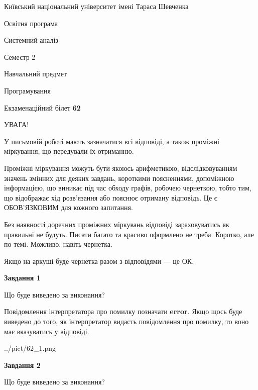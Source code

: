 \documentclass[12pt, ukrainian]{article}
\begin{document}
{{\begin {small}\par
{ \center  Київський національний університет імені Тараса Шевченка \par}
{\parbox {5 cm}{Освітня програма \hfill}{\parbox {7 cm}{Системний аналіз \hfill}}\parbox {6 cm}{\hfill Семестр 2}}\par
{\parbox {5 cm} {Навчальний предмет \hfill}\parbox {7 cm}{Програмування \hfill}\parbox {6cm}{\hfill}\par}\vspace{-7pt} \end{small}}{\center Екзаменаційний білет \No \textbf
{ 62 }\par}}
{
\begin {large}
УВАГА!

У письмовій роботі мають зазначатися всі відповіді, а також проміжні міркування, що передували їх отриманню.

Проміжні міркування можуть бути якоюсь арифметикою, відслідковуванням зна\-чень змінних для деяких завдань,
короткими поясненнями, допоміжною інформацією, що виникає під час обходу графів, робочею чернеткою,
тобто тим, що відображає хід розв’язання або пояснює отриману відповідь.
Це є ОБОВ’ЯЗКОВИМ для кожного запитання.

Без наявності доречних проміжних міркувань відповіді зараховуватись як правиль\-ні не будуть.
Писати багато та красиво оформлено не треба. Коротко, але по темі. Можли\-во, навіть чернетка.

Якщо на аркуші буде чернетка разом з відповідями --- це ОК.

\newpage

{\begin {center}\textbf{Завдання 1}\end {center}}\par
Що буде виведено за виконання?

Повідомлення інтерпретатора про помилку позначати \textbf{error}.
Якщо щось буде виведено до того, як інтерпретатор видасть повідомлення про помилку, 
то воно має вказуватись у відповіді. \par


\begin{center}
	{../pict/62_1.png}
\end{center}
\newpage

{\begin {center}\textbf{Завдання 2}\end {center}}\par
Що буде виведено за виконання?


\end{large}}
\end{document}

